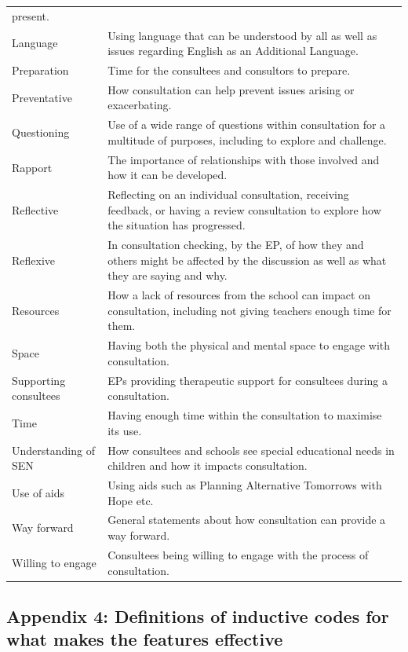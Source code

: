 \documentclass[
  english,
  man,floatsintext]{apa6}
\begin{document}
\begin{longtable}[]{@{}
  >{\raggedright\arraybackslash}p{}
  >{\raggedright\arraybackslash}p{}@{}}
present. \\
Language & Using language that can be understood by
all as well as issues regarding English as
an Additional Language. \\
Preparation & Time for the consultees and consultors to
prepare. \\
Preventative & How consultation can help prevent issues
arising or exacerbating. \\
Questioning & Use of a wide range of questions within
consultation for a multitude of purposes,
including to explore and challenge. \\
Rapport & The importance of relationships with those
involved and how it can be developed. \\
Reflective & Reflecting on an individual consultation,
receiving feedback, or having a review
consultation to explore how the situation
has progressed. \\
Reflexive & In consultation checking, by the EP, of how
they and others might be affected by the
discussion as well as what they are saying
and why. \\
Resources & How a lack of resources from the school can
impact on consultation, including not
giving teachers enough time for them. \\
Space & Having both the physical and mental space
to engage with consultation. \\
Supporting consultees & EPs providing therapeutic support for
consultees during a consultation. \\
Time & Having enough time within the consultation
to maximise its use. \\
Understanding of SEN & How consultees and schools see special
educational needs in children and how it
impacts consultation. \\
Use of aids & Using aids such as Planning Alternative
Tomorrows with Hope etc. \\
Way forward & General statements about how consultation
can provide a way forward. \\
Willing to engage & Consultees being willing to engage with the
process of consultation. \\
\bottomrule
\end{longtable}

\newpage

\hypertarget{appendix-4-definitions-of-inductive-codes-for-what-makes-the-features-effective}{%
\subsection{Appendix 4: Definitions of inductive codes for what makes the features effective}\label{appendix-4-definitions-of-inductive-codes-for-what-makes-the-features-effective}}
\end{document}
